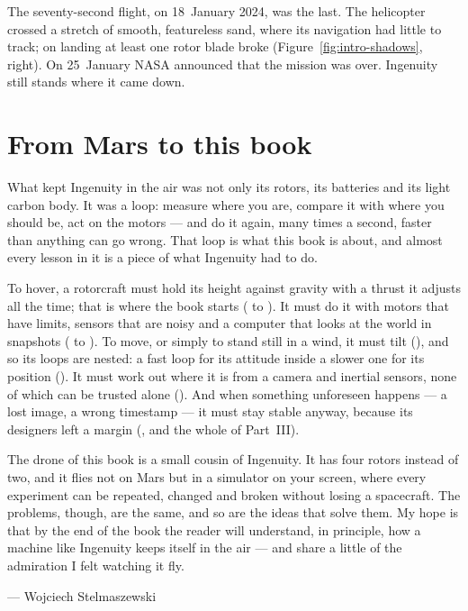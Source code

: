 The seventy-second flight, on 18~January 2024, was the last. The helicopter crossed a stretch of smooth, featureless sand, where its navigation had little to track; on landing at least one rotor blade broke (Figure~\ref{fig:intro-shadows}, right). On 25~January NASA announced that the mission was over. Ingenuity still stands where it came down.

\section{From Mars to this book}

What kept Ingenuity in the air was not only its rotors, its batteries and its light carbon body. It was a loop: measure where you are, compare it with where you should be, act on the motors — and do it again, many times a second, faster than anything can go wrong. That loop is what this book is about, and almost every lesson in it is a piece of what Ingenuity had to do.

To hover, a rotorcraft must hold its height against gravity with a thrust it adjusts all the time; that is where the book starts ( to ). It must do it with motors that have limits, sensors that are noisy and a computer that looks at the world in snapshots ( to ). To move, or simply to stand still in a wind, it must tilt (), and so its loops are nested: a fast loop for its attitude inside a slower one for its position (). It must work out where it is from a camera and inertial sensors, none of which can be trusted alone (). And when something unforeseen happens — a lost image, a wrong timestamp — it must stay stable anyway, because its designers left a margin (, and the whole of Part~III).

The drone of this book is a small cousin of Ingenuity. It has four rotors instead of two, and it flies not on Mars but in a simulator on your screen, where every experiment can be repeated, changed and broken without losing a spacecraft. The problems, though, are the same, and so are the ideas that solve them. My hope is that by the end of the book the reader will understand, in principle, how a machine like Ingenuity keeps itself in the air — and share a little of the admiration I felt watching it fly.\par
\smallskip
{\raggedleft\sffamily\small\color{muted}— Wojciech Stelmaszewski\par}

